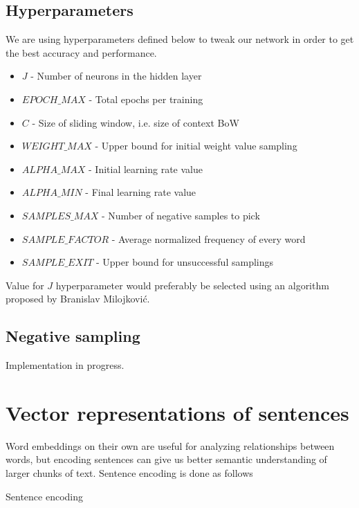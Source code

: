 \documentclass{article}
\newcommand{\SetAlgoStyle}{
	\SetAlgoNoLine
	\SetAlgoNoEnd
	\DontPrintSemicolon
}
\begin{document}
\subsection{Hyperparameters}

We are using hyperparameters defined below to tweak our network in order to get the best accuracy and performance.

\begin{itemize}
	\item $J$ - Number of neurons in the hidden layer
	\item $EPOCH\_MAX$ - Total epochs per training
	\item $C$ - Size of sliding window, i.e. size of context BoW
	\item $WEIGHT\_MAX$ - Upper bound for initial weight value sampling
	\item $ALPHA\_MAX$ - Initial learning rate value
	\item $ALPHA\_MIN$ - Final learning rate value
	\item $SAMPLES\_MAX$ - Number of negative samples to pick
	\item $SAMPLE\_FACTOR$ - Average normalized frequency of every word
	\item $SAMPLE\_EXIT$ - Upper bound for unsuccessful samplings
\end{itemize}

\medbreak

Value for $J$ hyperparameter would preferably be selected using an algorithm proposed by Branislav Milojković.

\subsection{Negative sampling}

Implementation in progress.

\section{Vector representations of sentences}

Word embeddings on their own are useful for analyzing relationships between
words, but encoding sentences can give us better semantic understanding of
larger chunks of text. Sentence encoding is done as follows

\begin{algorithm}[H]
	\caption{Sentence encoding}
	\SetAlgoStyle
\end{algorithm}
\end{document}
